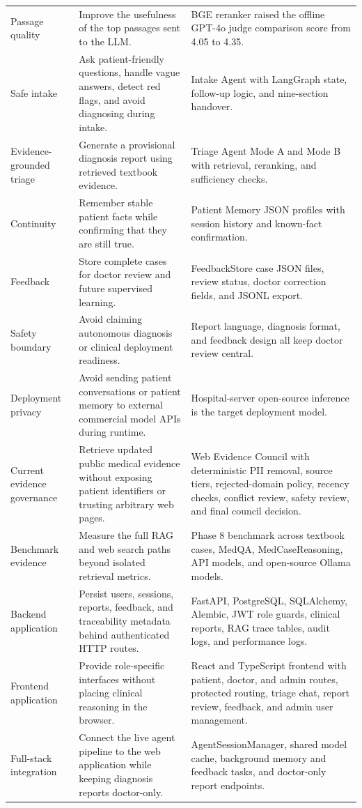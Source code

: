 \begin{longtable}{p{} p{} p{}}
Passage quality & Improve the usefulness of the top passages sent to the LLM. & BGE reranker raised the offline GPT-4o judge comparison score from 4.05 to 4.35.\\
Safe intake & Ask patient-friendly questions, handle vague answers, detect red flags, and avoid diagnosing during intake. & Intake Agent with LangGraph state, follow-up logic, and nine-section handover.\\
Evidence-grounded triage & Generate a provisional diagnosis report using retrieved textbook evidence. & Triage Agent Mode A and Mode B with retrieval, reranking, and sufficiency checks.\\
Continuity & Remember stable patient facts while confirming that they are still true. & Patient Memory JSON profiles with session history and known-fact confirmation.\\
Feedback & Store complete cases for doctor review and future supervised learning. & FeedbackStore case JSON files, review status, doctor correction fields, and JSONL export.\\
Safety boundary & Avoid claiming autonomous diagnosis or clinical deployment readiness. & Report language, diagnosis format, and feedback design all keep doctor review central.\\
Deployment privacy & Avoid sending patient conversations or patient memory to external commercial model APIs during runtime. & Hospital-server open-source inference is the target deployment model.\\
Current evidence governance & Retrieve updated public medical evidence without exposing patient identifiers or trusting arbitrary web pages. & Web Evidence Council with deterministic PII removal, source tiers, rejected-domain policy, recency checks, conflict review, safety review, and final council decision.\\
Benchmark evidence & Measure the full RAG and web search paths beyond isolated retrieval metrics. & Phase 8 benchmark across textbook cases, MedQA, MedCaseReasoning, API models, and open-source Ollama models.\\
Backend application & Persist users, sessions, reports, feedback, and traceability metadata behind authenticated HTTP routes. & FastAPI, PostgreSQL, SQLAlchemy, Alembic, JWT role guards, clinical reports, RAG trace tables, audit logs, and performance logs.\\
Frontend application & Provide role-specific interfaces without placing clinical reasoning in the browser. & React and TypeScript frontend with patient, doctor, and admin routes, protected routing, triage chat, report review, feedback, and admin user management.\\
Full-stack integration & Connect the live agent pipeline to the web application while keeping diagnosis reports doctor-only. & AgentSessionManager, shared model cache, background memory and feedback tasks, and doctor-only report endpoints.\\
\bottomrule
\end{longtable}

